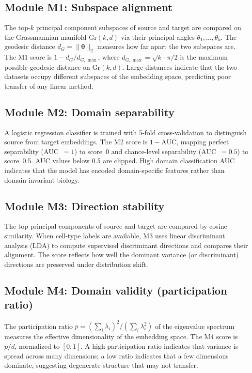 \documentclass[11pt,letterpaper]{article}
\newcommand{\Gr}{\mathrm{Gr}}
\begin{document}
\subsection{Module M1: Subspace alignment}

The top-$k$ principal component subspaces of source and target are compared on the Grassmannian manifold $\Gr(k, d)$ via their principal angles $\theta_1, \ldots, \theta_k$. The geodesic distance $d_G = \|\boldsymbol{\theta}\|_2$ measures how far apart the two subspaces are. The M1 score is $1 - d_G / d_{G,\max}$, where $d_{G,\max} = \sqrt{k} \cdot \pi/2$ is the maximum possible geodesic distance on $\Gr(k, d)$. Large distances indicate that the two datasets occupy different subspaces of the embedding space, predicting poor transfer of any linear method.

\subsection{Module M2: Domain separability}

A logistic regression classifier is trained with 5-fold cross-validation to distinguish source from target embeddings. The M2 score is $1 - \mathrm{AUC}$, mapping perfect separability (AUC~$= 1$) to score~0 and chance-level separability (AUC~$= 0.5$) to score~0.5. AUC values below 0.5 are clipped. High domain classification AUC indicates that the model has encoded domain-specific features rather than domain-invariant biology.

\subsection{Module M3: Direction stability}

The top principal components of source and target are compared by cosine similarity. When cell-type labels are available, M3 uses linear discriminant analysis (LDA) to compute supervised discriminant directions and compares their alignment. The score reflects how well the dominant variance (or discriminant) directions are preserved under distribution shift.

\subsection{Module M4: Domain validity (participation ratio)}

The participation ratio $p = (\sum_i \lambda_i)^2 / (\sum_i \lambda_i^2)$ of the eigenvalue spectrum measures the effective dimensionality of the embedding space. The M4 score is $p / d$, normalized to $[0, 1]$. A high participation ratio indicates that variance is spread across many dimensions; a low ratio indicates that a few dimensions dominate, suggesting degenerate structure that may not transfer.
\end{document}
